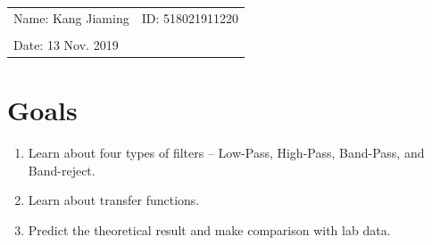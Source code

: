 \documentclass{article}
\begin{document}
\vspace*{0.25cm}

\noindent\hrulefill

\thispagestyle{empty}

\begin{center}
    \begin{large}
    \end{large}

    \hrulefill

    \vspace*{5cm}
    \begin{Large}
    \end{Large}

    \vspace{2em}

    \begin{large}
    \end{large}
\end{center}
\vfill

\begin{table}[h!]
    \flushleft
    \begin{tabular}{ll}
        Name: Kang Jiaming \hspace*{2em} &
        ID: 518021911220\hspace*{2em}     \\

        \\

        Date:  13 Nov. 2019
    \end{tabular}
\end{table}

\hfill
\newpage

\section{Goals}
\begin{enumerate}
    \item Learn about four types of filters – Low-Pass, High-Pass, Band-Pass, and Band-reject.
    \item Learn about transfer functions.
    \item Predict the theoretical result and make comparison with lab data.
\end{enumerate}
\end{document}
